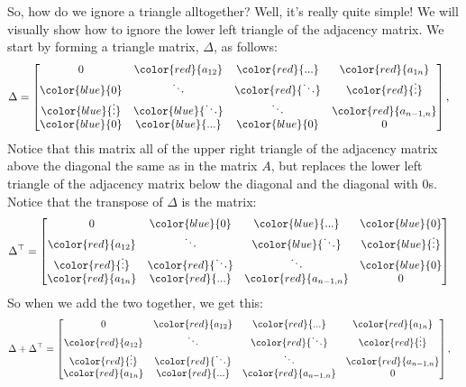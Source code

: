 \documentclass[letterpaper,10pt,english]{jupyterBook}
\begin{document}
\sphinxAtStartPar
So, how do we ignore a triangle all\sphinxhyphen{}together? Well, it’s really quite simple! We will visually show how to ignore the lower left triangle of the adjacency matrix. We start by forming a triangle matrix, \(\Delta\), as follows:
\begin{align*}
    \Delta &= \begin{bmatrix}
        0 & \color{red}{a_{12}} & \color{red}{...} & \color{red}{a_{1n}} \\
        \color{blue}{0} & \ddots & \color{red}{\ddots} & \color{red}{\vdots} \\
        \color{blue}{\vdots} &\color{blue}{\ddots} &\ddots & \color{red}{a_{n-1, n}}\\
        \color{blue}{0} & \color{blue}{...} & \color{blue}{0} & 0
    \end{bmatrix},
\end{align*}
\sphinxAtStartPar
Notice that this matrix  all of the upper right triangle of the adjacency matrix above the diagonal the same as in the matrix \(A\), but replaces the lower left triangle of the adjacency matrix below the diagonal and the diagonal with \(0\)s. Notice that the transpose of \(\Delta\) is the matrix:
\begin{align*}
    \Delta^\top &= \begin{bmatrix}
        0 & \color{blue}{0} & \color{blue}{...} &\color{blue}{0}\\
        \color{red}{a_{12}}& \ddots & \color{blue}{\ddots} & \color{blue}{\vdots} \\
        \color{red}{\vdots}&\color{red}{\ddots} & \ddots & \color{blue}{0} \\
        \color{red}{a_{1n}}&\color{red}{...} &\color{red}{a_{n-1,n}} & 0
    \end{bmatrix}
\end{align*}
\sphinxAtStartPar
So when we add the two together, we get this:
\begin{align*}
    \Delta + \Delta^\top &= \begin{bmatrix}
        0 & \color{red}{a_{12}} & \color{red}{...} & \color{red}{a_{1n}} \\
        \color{red}{a_{12}} & \ddots & \color{red}{\ddots} & \color{red}{\vdots} \\
        \color{red}{\vdots}&\color{red}{\ddots} &\ddots & \color{red}{a_{n-1, n}}\\
        \color{red}{a_{1n}}&\color{red}{...} &\color{red}{a_{n-1,n}} & 0
    \end{bmatrix},
\end{align*}
\end{document}

